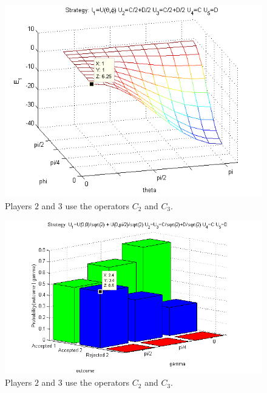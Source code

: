 \begin{figure}[h!]
\centering 
\includegraphics[scale=0.80]{Figures/1.5qubit/mixedclassical.png}
\caption{Players $2$ and $3$ use the operators $C_{2}$ and $C_{3}$. }
\label{fig:pg_3players_99_0_1:2}
\end{figure}

\begin{figure}[h!]
\centering 
\includegraphics[scale=0.80]{Figures/1.5qubit/mixedmixedclassical.png}
\caption{Players $2$ and $3$ use the operators $C_{2}$ and $C_{3}$. }
\label{fig:pg_3players_99_0_1:2}
\end{figure}




